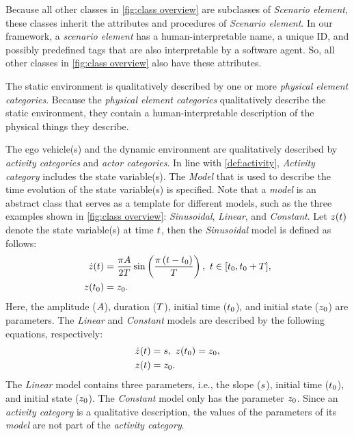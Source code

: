 \cstartb Because all other classes in \cref{fig:class overview} are subclasses of \textit{Scenario element}, these classes inherit the attributes and procedures of \textit{Scenario element}. In our framework, a \textit{scenario element} has a human-interpretable name, a unique ID, and possibly predefined tags that are also interpretable by a software agent. So, all other classes in \cref{fig:class overview} also have these attributes. \cendb

The static environment is qualitatively described by \cstarte one or more \textit{physical element categories}. \cende
Because the \cstarte\textit{physical element categories} \cende qualitatively describe the static environment, they contain a human-interpretable description of the \cstartc physical things they describe\cendc.

The ego vehicle\cstartd(s) \cendd and the dynamic environment are qualitatively described by \textit{activity categories} and \textit{actor categories}. 
In line with \cref{def:activity}, \textit{Activity category} includes the state variable(s).
The \textit{Model} that is used to describe the time evolution of the state variable(s) is specified. 
\cstarte Note that a \textit{model} is an abstract class that serves as a template for different models, such as the three examples shown in \cref{fig:class overview}: \textit{Sinusoidal}, \textit{Linear}, and \textit{Constant}. 
Let $z(t)$ denote the state variable(s) at time $t$, then the \textit{Sinusoidal} model is defined as follows:
\begin{align}
	\statedot(\time) &= \frac{\pi \amplitude}{2\duration} \sin \left( \frac{\pi \left( \time - \timeinit\right)}{\duration} \right),\ \time \in [\timeinit, \timeinit+\duration], \label{eq:sinusoidala} \\
	\state(\timeinit) &= \stateinit. \label{eq:sinusoidalb}
\end{align}
Here, the amplitude ($A$), duration ($T$), initial time ($t_{0}$), and initial state ($z_{0}$) are parameters. 
The \textit{Linear} and \textit{Constant} models are described by the following equations, respectively:
\begin{align}
	\statedot(\time) &= \slope,\ \state(\timeinit) = \stateinit, \label{eq:linear} \\
	\state(\time) &= \stateinit. \label{eq:constant}
\end{align}
The \textit{Linear} model contains three parameters, i.e., the slope ($s$), initial time ($t_{0}$), and initial state ($z_{0}$). The \textit{Constant} model only has the parameter $z_{0}$.
Since an \textit{activity category} is a qualitative description, the values of the parameters of its \textit{model} are not part of the \textit{activity category}. \cende

